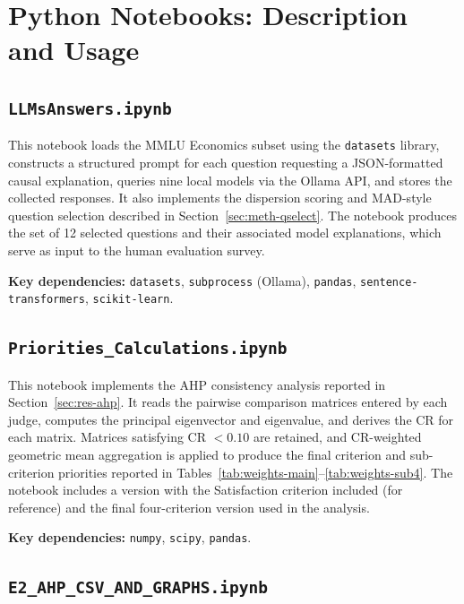 \chapter{Python Notebooks: Description and Usage}
\label{app:code}

\section*{\texttt{LLMsAnswers.ipynb}}
\label{appsec:llmsanswers}

This notebook loads the MMLU Economics subset using the \texttt{datasets} library,
constructs a structured prompt for each question requesting a JSON-formatted causal
explanation, queries nine local models via the Ollama API, and stores the collected
responses. It also implements the dispersion scoring and MAD-style question selection
described in Section~\ref{sec:meth-qselect}. The notebook produces the set of 12
selected questions and their associated model explanations, which serve as input to
the human evaluation survey.

\textbf{Key dependencies:} \texttt{datasets}, \texttt{subprocess} (Ollama),
\texttt{pandas}, \texttt{sentence-transformers}, \texttt{scikit-learn}.

\section*{\texttt{Priorities\_Calculations.ipynb}}
\label{appsec:priorities}

This notebook implements the AHP consistency analysis reported in
Section~\ref{sec:res-ahp}. It reads the pairwise comparison matrices entered by each
judge, computes the principal eigenvector and eigenvalue, and derives the CR for each
matrix. Matrices satisfying CR $< 0.10$ are retained, and CR-weighted geometric mean
aggregation is applied to produce the final criterion and sub-criterion priorities
reported in Tables~\ref{tab:weights-main}--\ref{tab:weights-sub4}. The notebook
includes a version with the Satisfaction criterion included (for reference) and the
final four-criterion version used in the analysis.

\textbf{Key dependencies:} \texttt{numpy}, \texttt{scipy}, \texttt{pandas}.

\section*{\texttt{E2\_AHP\_CSV\_AND\_GRAPHS.ipynb}}
\label{appsec:e2}

